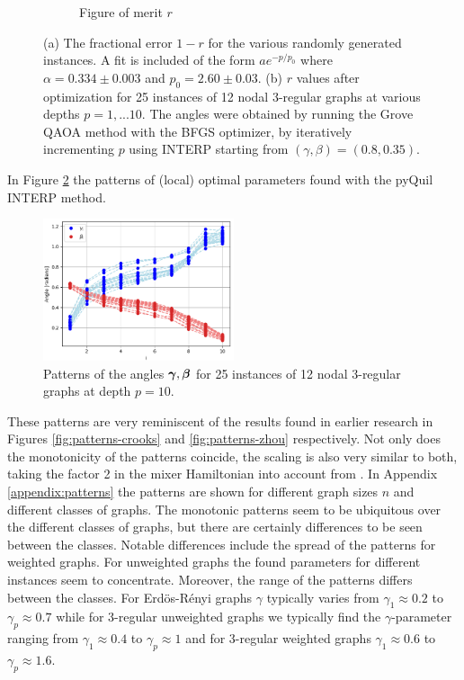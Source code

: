 \begin{figure}[H]
\begin{subfigure}[t]{0.48\textwidth}
		\caption{Figure of merit $r$}
	\end{subfigure}%
	\caption{(a) The fractional error $1-r$ for the various randomly generated instances. A fit is included of the form $ae^{-p/p_0}$ where $\alpha = 0.334 \pm 0.003$ and $p_0 = 2.60 \pm 0.03$. (b) $r$ values after optimization for 25 instances of 12 nodal 3-regular graphs at various depths $p =  1, ... 10$. The angles were obtained by running the Grove QAOA method with the BFGS optimizer, by iteratively incrementing $p$ using INTERP starting from $(\gamma, \beta) = (0.8, 0.35)$.}
	\label{fig:Fp 3-regular 12-nodal}
\end{figure}

In Figure \ref{fig:pattern 3-regular 12-nodal} the patterns of (local) optimal parameters found with the pyQuil INTERP method.
\begin{figure}[H]
	\centering
	\includegraphics[width=0.5\textwidth]{figures/interp/pattern_3-regular_12-nodal.png}
	\caption{Patterns of the angles $\bm{\gamma},\bm{\beta}$ for 25 instances of 12 nodal 3-regular graphs at depth $p=10$.}
	\label{fig:pattern 3-regular 12-nodal}
\end{figure}

These patterns are very reminiscent of the results found in earlier research \cite{Crooks18,ZWCPL18} in Figures \ref{fig:patterns-crooks} and \ref{fig:patterns-zhou} respectively. Not only does the monotonicity of the patterns coincide, the scaling is also very similar to both, taking the factor 2 in the mixer Hamiltonian into account from \cite{Crooks18}.  In Appendix \ref{appendix:patterns} the patterns are shown for different graph sizes $n$ and different classes of graphs. The monotonic patterns seem to be ubiquitous over the different classes of graphs, but there are certainly differences to be seen between the classes. Notable differences include the spread of the patterns for weighted graphs. For unweighted graphs the found parameters for different instances seem to concentrate. Moreover, the range of the patterns differs between the classes. For Erd\"os-R\'enyi graphs $\gamma$ typically varies from $\gamma_1 \approx 0.2$ to $\gamma_p \approx 0.7$ while for 3-regular unweighted graphs we typically find the $\gamma$-parameter ranging from $\gamma_1 \approx 0.4$ to $\gamma_p \approx 1$ and for 3-regular weighted graphs $\gamma_1 \approx 0.6$ to $\gamma_p \approx 1.6$.

